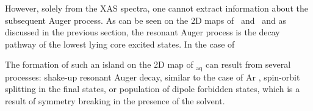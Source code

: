 

However, solely from the XAS spectra, one cannot extract information about the subsequent Auger process. As can be seen on the 2D maps of \ki~and \cli~and as discussed in the previous section, the resonant Auger process is the decay pathway of the lowest lying core excited states. In the case of 

The formation of such an island on the 2D map of \ki$_{\text{aq}}$ can result from several processes: shake-up resonant Auger decay, similar to the case of Ar \citep{ceolin15:022502}, spin-orbit splitting in the final states, or population of dipole forbidden states, which is a result of symmetry breaking in the presence of the solvent. 

